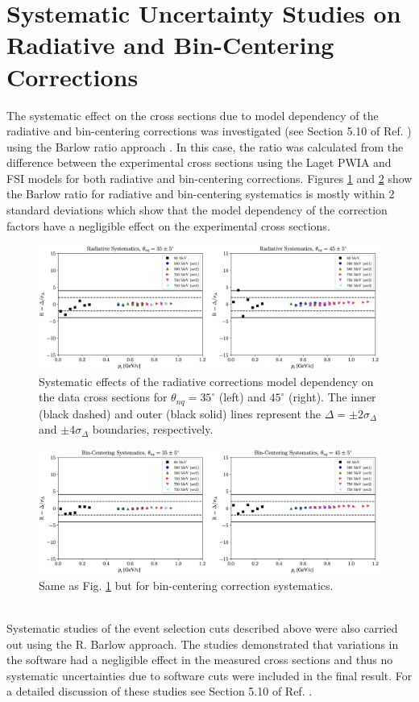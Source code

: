 \documentclass[aps, prl]{revtex4-2}  %
\begin{document}
\section{\large Systematic Uncertainty Studies on Radiative and Bin-Centering Corrections }
\indent The systematic effect on the cross sections due to model dependency of the radiative and bin-centering corrections was investigated (see Section 5.10 of Ref. \cite{cyero_phdthesis})
using the Barlow ratio approach \cite{barlow2002systematic,barlow2017}. In this case, the ratio was calculated from the difference between the experimental cross
sections using the Laget PWIA and FSI models for both radiative and bin-centering corrections. Figures \ref{fig:rad_sys} and \ref{fig:bc_sys}
show the Barlow ratio for radiative and bin-centering systematics is mostly within 2 standard deviations which show that
the model dependency of the correction factors have a negligible effect on the experimental cross sections.
\begin{figure}[!h]
\includegraphics[scale=0.37]{rad_sys.png}
\caption{Systematic effects of the radiative corrections model dependency on the data cross sections
  for $\theta_{nq}=35^{\circ}$ (left) and $45^{\circ}$ (right). The inner (black dashed) and outer (black solid)
  lines represent the $\Delta=\pm2\sigma_{\Delta}$ and $\pm4\sigma_{\Delta}$ boundaries, respectively.  }
\label{fig:rad_sys}
\end{figure}
\begin{figure}[!ht]
\includegraphics[scale=0.37]{bc_sys.png}
\caption{Same as Fig. \ref{fig:rad_sys} but for bin-centering correction systematics.}
\label{fig:bc_sys}
\end{figure}\\
\indent Systematic studies of the event selection cuts described above were also carried out using the R. Barlow approach. The studies demonstrated that variations in the software had a negligible
effect in the measured cross sections and thus no systematic uncertainties due to software cuts were included in the final result. For a detailed discussion of these studies see Section 5.10 of Ref. \cite{cyero_phdthesis}.
\\\\

\end{document}
